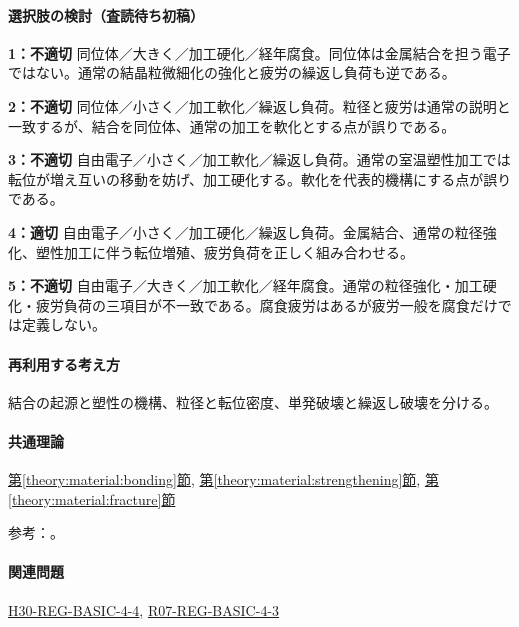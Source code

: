 \paragraph{選択肢の検討（査読待ち初稿）}\mbox{}\par

\noindent\textbf{1：不適切} 同位体／大きく／加工硬化／経年腐食。同位体は金属結合を担う電子ではない。通常の結晶粒微細化の強化と疲労の繰返し負荷も逆である。\par

\noindent\textbf{2：不適切} 同位体／小さく／加工軟化／繰返し負荷。粒径と疲労は通常の説明と一致するが、結合を同位体、通常の加工を軟化とする点が誤りである。\par

\noindent\textbf{3：不適切} 自由電子／小さく／加工軟化／繰返し負荷。通常の室温塑性加工では転位が増え互いの移動を妨げ、加工硬化する。軟化を代表的機構にする点が誤りである。\par

\noindent\textbf{4：適切} 自由電子／小さく／加工硬化／繰返し負荷。金属結合、通常の粒径強化、塑性加工に伴う転位増殖、疲労負荷を正しく組み合わせる。\par

\noindent\textbf{5：不適切} 自由電子／大きく／加工軟化／経年腐食。通常の粒径強化・加工硬化・疲労負荷の三項目が不一致である。腐食疲労はあるが疲労一般を腐食だけでは定義しない。\par

\paragraph{再利用する考え方} 結合の起源と塑性の機構、粒径と転位密度、単発破壊と繰返し破壊を分ける。

\paragraph{共通理論} \hyperref[theory:material:bonding]{第\ref*{theory:material:bonding}節}, \hyperref[theory:material:strengthening]{第\ref*{theory:material:strengthening}節}, \hyperref[theory:material:fracture]{第\ref*{theory:material:fracture}節}

\par 参考：\cite{mit_material_dislocations2001,mit_material_fatigue2001,mit_material_atomistic2001}。

\paragraph{関連問題} \hyperref[q:h30-reg-basic-4-4]{H30-REG-BASIC-4-4}, \hyperref[q:r07-reg-basic-4-3]{R07-REG-BASIC-4-3}

